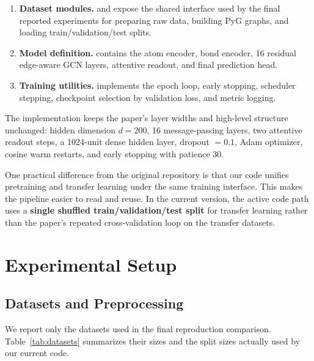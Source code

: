 \begin{enumerate}
    \item \textbf{Dataset modules.}  and  expose the shared interface used by the final reported experiments for preparing raw data, building PyG graphs, and loading train/validation/test splits.
    \item \textbf{Model definition.}  contains the atom encoder, bond encoder, 16 residual edge-aware GCN layers, attentive readout, and final prediction head.
    \item \textbf{Training utilities.}  implements the epoch loop, early stopping, scheduler stepping, checkpoint selection by validation loss, and metric logging.
\end{enumerate}

The implementation keeps the paper's layer widths and high-level structure unchanged: hidden dimension \(d=200\), 16 message-passing layers, two attentive readout steps, a 1024-unit dense hidden layer, dropout \(=0.1\), Adam optimizer, cosine warm restarts, and early stopping with patience 30.

One practical difference from the original repository is that our code unifies pretraining and transfer learning under the same training interface. This makes the pipeline easier to read and reuse. In the current version, the active code path uses a \textbf{single shuffled train/validation/test split} for transfer learning rather than the paper's repeated cross-validation loop on the transfer datasets.

\section{Experimental Setup}

\subsection{Datasets and Preprocessing}

We report only the datasets used in the final reproduction comparison. Table~\ref{tab:datasets} summarizes their sizes and the split sizes actually used by our current code.

